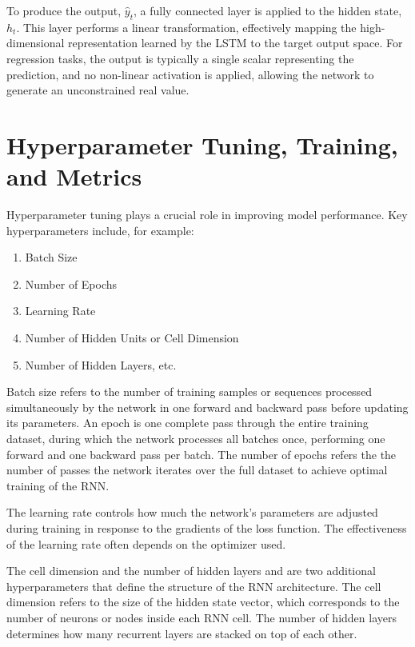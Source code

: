 \documentclass[
  letterpaper,
  double,
  12pt,
  1.0in]{beavtex}
\begin{document}
To produce the output, \(\hat{y}_t\), a fully connected layer is applied
to the hidden state, \(h_t\). This layer performs a linear
transformation, effectively mapping the high-dimensional representation
learned by the LSTM to the target output space. For regression tasks,
the output is typically a single scalar representing the prediction, and
no non-linear activation is applied, allowing the network to generate an
unconstrained real value.

\section{Hyperparameter Tuning, Training, and
Metrics}\label{hyperparameter-tuning-training-and-metrics}

Hyperparameter tuning plays a crucial role in improving model
performance. Key hyperparameters include, for example:

\begin{enumerate}
\def\labelenumi{\arabic{enumi}.}
\item
  Batch Size
\item
  Number of Epochs
\item
  Learning Rate
\item
  Number of Hidden Units or Cell Dimension
\item
  Number of Hidden Layers, etc.
\end{enumerate}

Batch size refers to the number of training samples or sequences
processed simultaneously by the network in one forward and backward pass
before updating its parameters. An epoch is one complete pass through
the entire training dataset, during which the network processes all
batches once, performing one forward and one backward pass per batch.
The number of epochs refers the the number of passes the network
iterates over the full dataset to achieve optimal training of the RNN.

The learning rate controls how much the network's parameters are
adjusted during training in response to the gradients of the loss
function. The effectiveness of the learning rate often depends on the
optimizer used.

The cell dimension and the number of hidden layers and are two
additional hyperparameters that define the structure of the RNN
architecture. The cell dimension refers to the size of the hidden state
vector, which corresponds to the number of neurons or nodes inside each
RNN cell. The number of hidden layers determines how many recurrent
layers are stacked on top of each other.
\end{document}
